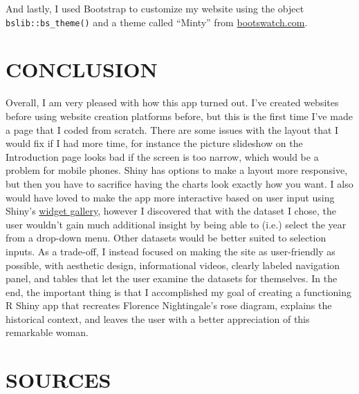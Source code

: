 \documentclass[
  dvipsnames]{article}
\begin{document}
And lastly, I used Bootstrap to customize my website using the object
\texttt{bslib::bs\_theme()} and a theme called ``Minty'' from
\href{https://bootswatch.com/}{bootswatch.com}.

\hypertarget{section-14}{%
\section{\texorpdfstring{\textcolor{WildStrawberry}{CONCLUSION}}{}}\label{section-14}}

Overall, I am very pleased with how this app turned out. I've created
websites before using website creation platforms before, but this is the
first time I've made a page that I coded from scratch. There are some
issues with the layout that I would fix if I had more time, for instance
the picture slideshow on the Introduction page looks bad if the screen
is too narrow, which would be a problem for mobile phones. Shiny has
options to make a layout more responsive, but then you have to sacrifice
having the charts look exactly how you want. I also would have loved to
make the app more interactive based on user input using Shiny's
\href{https://shiny.rstudio.com/gallery/widget-gallery.html}{widget
gallery}, however I discovered that with the dataset I chose, the user
wouldn't gain much additional insight by being able to (i.e.) select the
year from a drop-down menu. Other datasets would be better suited to
selection inputs. As a trade-off, I instead focused on making the site
as user-friendly as possible, with aesthetic design, informational
videos, clearly labeled navigation panel, and tables that let the user
examine the datasets for themselves. In the end, the important thing is
that I accomplished my goal of creating a functioning R Shiny app that
recreates Florence Nightingale's rose diagram, explains the historical
context, and leaves the user with a better appreciation of this
remarkable woman.

\newpage

\hypertarget{section-15}{%
\section{\texorpdfstring{\textcolor{WildStrawberry}{SOURCES}}{}}\label{section-15}}
\end{document}
